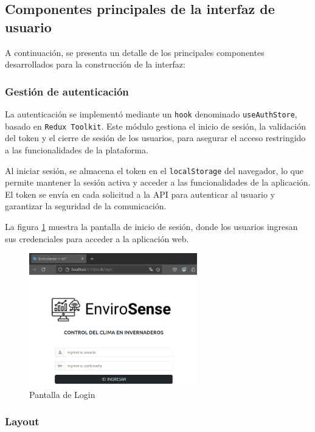 \subsection{Componentes principales de la interfaz de usuario}

A continuación, se presenta un detalle de los principales componentes
desarrollados para la construcción de la interfaz:

\subsubsection{Gestión de autenticación}

La autenticación se implementó mediante un \texttt{hook} denominado
\texttt{useAuthStore}, basado en \texttt{Redux Toolkit}. Este módulo gestiona
el inicio de sesión, la validación del token y el cierre de sesión de los
usuarios, para asegurar el acceso restringido a las funcionalidades de la
plataforma.

Al iniciar sesión, se almacena el token en el \texttt{localStorage} del
navegador, lo que permite mantener la sesión activa y acceder a las
funcionalidades de la aplicación. El token se envía en cada solicitud a la API
para autenticar al usuario y garantizar la seguridad de la comunicación.

La figura \ref{fig:login} muestra la pantalla de inicio de sesión, donde los
usuarios ingresan sus credenciales para acceder a la aplicación web.

\begin{figure}[H]
    \centering
    \includegraphics[width=0.65\textwidth]{./Images/24_login.png}
    \caption{Pantalla de Login}
    \label{fig:login}
\end{figure}

\subsubsection{Layout}

